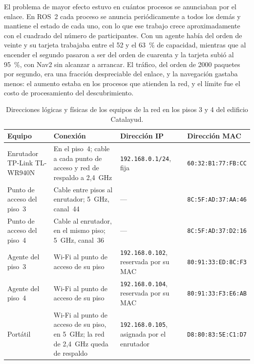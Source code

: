 El problema de mayor efecto estuvo en cuántos procesos se anunciaban por el enlace. En ROS~2 cada proceso se anuncia periódicamente a todos los demás y mantiene el estado de cada uno, con lo que ese trabajo crece aproximadamente con el cuadrado del número de participantes. Con un agente había del orden de veinte y su tarjeta trabajaba entre el 52 y el 63~\% de capacidad, mientras que al encender el segundo pasaron a ser del orden de cuarenta y la tarjeta subió al 95~\%, con Nav2 sin alcanzar a arrancar. El tráfico, del orden de 2000 paquetes por segundo, era una fracción despreciable del enlace, y la navegación gastaba menos: el aumento estaba en los procesos que atienden la red, y el límite fue el costo de procesamiento del descubrimiento.

\begin{table}[H]
  \centering\footnotesize{}
  \caption{Direcciones lógicas y físicas de los equipos de la red en los pisos 3 y 4 del edificio Catalayud.}
  \label{tab:direcciones-red}
  \begin{tabular}{@{}>{\raggedright\arraybackslash}p{}>{\raggedright\arraybackslash}p{}>{\raggedright\arraybackslash}p{}>{\raggedright\arraybackslash}p{}@{}}
    \toprule
    \textbf{Equipo} & \textbf{Conexión} & \textbf{Dirección IP} & \textbf{Dirección MAC} \\ \midrule
    Enrutador TP-Link \mbox{TL-WR940N} & En el piso~4; cable a cada punto de acceso y red de respaldo a 2,4~GHz & \texttt{192.168.0.1/24}, fija & \texttt{60:32:B1:77:FB:CC} \\ \addlinespace
    Punto de acceso del piso~3 & Cable entre pisos al enrutador; 5~GHz, canal~44 & --- & \texttt{8C:5F:AD:37:AA:46} \\ \addlinespace
    Punto de acceso del piso~4 & Cable al enrutador, en el mismo piso; 5~GHz, canal~36 & --- & \texttt{8C:5F:AD:37:D2:16} \\ \addlinespace
    Agente del piso~3 & Wi-Fi al punto de acceso de su piso & \texttt{192.168.0.102}, reservada por su MAC & \texttt{80:91:33:ED:8C:F3} \\ \addlinespace
    Agente del piso~4 & Wi-Fi al punto de acceso de su piso & \texttt{192.168.0.104}, reservada por su MAC & \texttt{80:91:33:F3:E6:AB} \\ \addlinespace
    Portátil & Wi-Fi al punto de acceso de su piso, en 5~GHz; la red de 2,4~GHz queda de respaldo & \texttt{192.168.0.105}, asignada por el enrutador & \texttt{D8:80:83:5E:C1:D7} \\ \bottomrule
  \end{tabular}
\end{table}

